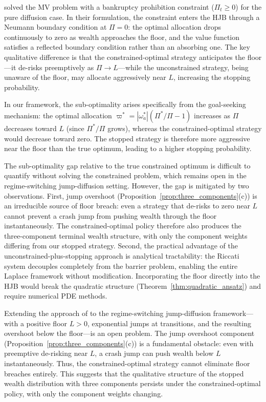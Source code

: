 \documentclass[11pt,a4paper]{article}
\numberwithin{equation}{section}
\begin{document}
\citet{BieleckiJinPliskaZhou2005} solved the MV problem with a bankruptcy prohibition constraint ($\Pi_t \geq 0$) for the pure diffusion case.  In their formulation, the constraint enters the HJB through a Neumann boundary condition at $\Pi = 0$: the optimal allocation drops continuously to zero as wealth approaches the floor, and the value function satisfies a reflected boundary condition rather than an absorbing one.  The key qualitative difference is that the constrained-optimal strategy anticipates the floor---it de-risks preemptively as $\Pi \to L$---while the unconstrained strategy, being unaware of the floor, may allocate aggressively near $L$, increasing the stopping probability.

In our framework, the sub-optimality arises specifically from the goal-seeking mechanism: the optimal allocation $\varpi^* = |\omega^*_a|(\Pi^*/\Pi - 1)$ increases as $\Pi$ decreases toward $L$ (since $\Pi^*/\Pi$ grows), whereas the constrained-optimal strategy would decrease toward zero.  The stopped strategy is therefore more aggressive near the floor than the true optimum, leading to a higher stopping probability.

The sub-optimality gap relative to the true constrained optimum is 
difficult to quantify without solving the constrained problem, which 
remains open in the regime-switching jump-diffusion setting. However, 
the gap is mitigated by two observations. First, jump overshoot 
(Proposition~\ref{prop:three_components}(c)) is an irreducible source 
of floor breach: even a strategy that de-risks to zero near $L$ cannot 
prevent a crash jump from pushing wealth through the floor 
instantaneously. The constrained-optimal policy therefore also produces 
the three-component terminal wealth structure, with only the component 
weights differing from our stopped strategy. Second, the practical 
advantage of the unconstrained-plus-stopping approach is analytical 
tractability: the Riccati system decouples completely from the barrier 
problem, enabling the entire Laplace framework without modification. 
Incorporating the floor directly into the HJB would break the quadratic 
structure (Theorem~\ref{thm:quadratic_ansatz}) and require numerical 
PDE methods.


Extending the approach of \citet{BieleckiJinPliskaZhou2005} to the regime-switching jump-diffusion framework---with a positive floor $L > 0$, exponential jumps at transitions, and the resulting overshoot below the floor---is an open problem.  The jump overshoot component (Proposition~\ref{prop:three_components}(c)) is a fundamental obstacle: even with preemptive de-risking near $L$, a crash jump can push wealth below $L$ instantaneously. Thus, the constrained-optimal strategy cannot eliminate floor breaches entirely. This suggests that the qualitative structure of the stopped wealth distribution with three components persists under the constrained-optimal policy, with only the component weights changing.
\end{document}
